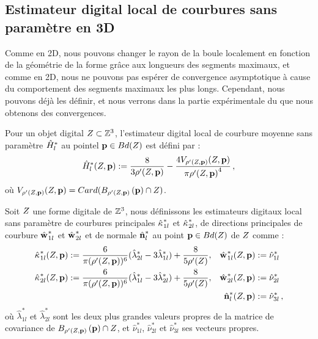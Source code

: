 \subsection{Estimateur digital local de courbures sans paramètre en 3D}

Comme en 2D, nous pouvons changer le rayon de la boule localement en fonction de
la géométrie de la forme grâce aux longueurs des segments maximaux, et comme en
2D, nous ne pouvons pas espérer de convergence asymptotique à cause du
comportement des segments maximaux les plus longs. Cependant, nous pouvons déjà
les définir, et nous verrons dans la partie expérimentale du
 que nous obtenons des convergences.
%
\begin{definition}
  Pour un objet digital $Z \subset \mathbb{Z}^3$, l'estimateur digital local de
  courbure moyenne sans paramètre $\hat{H}^{*}_{l}$ au pointel $\mathbf{p} \in
  Bd({Z})$ est défini par :
  \begin{equation}
    \hat{H}^{*}_{l}( Z, \mathbf{p} ) := \frac{8}{3 {\rho'(Z, \mathbf{p})}} - \frac{4 V_{{\rho'(Z, \mathbf{p})}}(Z, \mathbf{p})}{\pi{{\rho'(\ensuremath{Z}, \ensuremath{\mathbf{p}})}}^4} \,,
    \label{def:curvature-estimator-3d-mean-pfl}
  \end{equation}
  où $V_{\rho'(Z, \mathbf{p})}(Z, \mathbf{p}) = Card(B_{\rho'(Z, \mathbf{p})}\left(\mathbf{p}\right) \cap Z)$.
\end{definition}
%
\begin{definition}
  Soit $Z$ une forme digitale de $\mathbb{Z}^3$, nous définissons les estimateurs
  digitaux local sans paramètre de courbures principales $\hat{\kappa_{}}_{1l}^{*}$ et
  $\hat{\kappa_{}}_{2l}^{*}$, de directions principales de courbure $\hat{\mathbf{w}_{}}_{1l}^{*}$ et
  $\hat{\mathbf{w}_{}}_{2l}^{*}$ et de normale $\hat{\mathbf{n}{}}^{*}_{l}$ au point $\mathbf{p} \in
  Bd({Z})$ de $Z$ comme :
  \begin{align}
      \hat{\kappa_{}}_{1l}^{*}(Z, \mathbf{p})  &:= \frac{6}{\pi (\rho'(Z, \mathbf{p}))^6}(\hat{\lambda}^{*}_{2l} - 3\hat{\lambda}^{*}_{1l}) + \frac{8}{5 \rho'(Z)},
      &\hat{\mathbf{w}_{}}_{1l}^{*}(Z, \mathbf{p}) &:= \hat{\nu}^{*}_{1l} \\
      \hat{\kappa_{}}_{2l}^{*}(Z, \mathbf{p}) &:= \frac{6}{\pi (\rho'(Z, \mathbf{p}))^6}(\hat{\lambda}^{*}_{1l} - 3\hat{\lambda}^{*}_{2l}) + \frac{8}{5 \rho'(Z)},
      &\hat{\mathbf{w}_{}}_{2l}^{*}(Z, \mathbf{p}) &:= \hat{\nu}^{*}_{2l}\\
      & &\hat{\mathbf{n}{}}^{*}_{l}(Z, \mathbf{p}) &:=\hat{\nu}^{*}_{3l}\,,
  \end{align}
  où $\hat{\lambda}^{*}_{1l}$ et $\hat{\lambda}^{*}_{2l}$ sont les deux plus grandes
  valeurs propres de la matrice de covariance de $B_{{\rho'(Z, \mathbf{p})}}\left(\mathbf{p}\right)
  \cap Z$, et $ \hat{\nu}^{*}_{1l}$, $\hat{\nu}^{*}_{2l}$ et $\hat{\nu}^{*}_{3l}$
  ses vecteurs propres.
  \label{def:curvature-estimator-3d-k1k2-pfl}
\end{definition}
%
